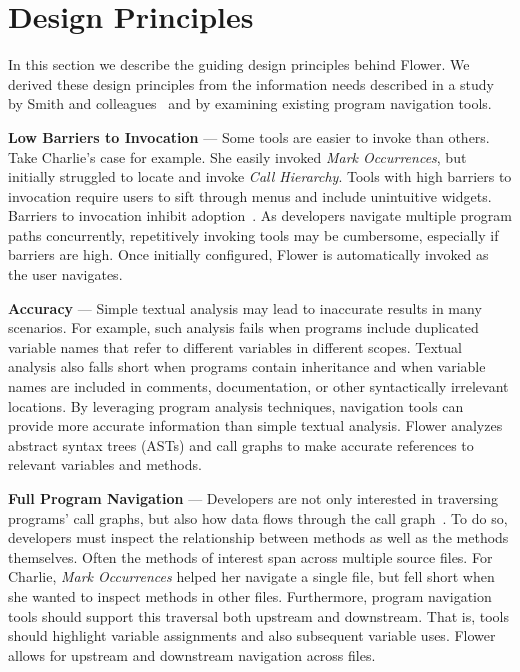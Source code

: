 \documentclass[conference]{IEEEtran}
\begin{document}
\section{Design Principles}
\label{DesignPrinciples}
In this section we describe the guiding design principles behind Flower. We derived these design principles from the information needs described in a study by Smith and colleagues~\cite{Smith2015} and by examining existing program navigation tools.

\vspace{1em} 
\noindent\textbf{Low Barriers to Invocation} ---
Some tools are easier to invoke than others. 
Take Charlie's case for example.
She easily invoked \emph{Mark Occurrences}, but initially struggled to locate and invoke \emph{Call Hierarchy}.
Tools with high barriers to invocation require users to sift through menus and include unintuitive widgets. 
Barriers to invocation inhibit adoption~\cite{johnson2013don}.
As developers navigate multiple program paths concurrently, repetitively invoking tools may be cumbersome, especially if barriers are high. 
Once initially configured, Flower is automatically invoked as the user navigates.

\vspace{1em} 
\noindent\textbf{Accuracy} ---
Simple textual analysis may lead to inaccurate results in many scenarios. For example, such analysis fails when programs include duplicated variable names that refer to different variables in different scopes. Textual analysis also falls short when programs contain inheritance and when variable names are included in comments, documentation, or other syntactically irrelevant locations.
By leveraging program analysis techniques, navigation tools can provide more accurate information than simple textual analysis.
Flower analyzes abstract syntax trees (ASTs) and call graphs to make accurate references to relevant variables and methods.

\vspace{1em} 
\noindent\textbf{Full Program Navigation}  ---
Developers are not only interested in traversing programs' call graphs, but also how data flows through the call graph~\cite{Smith2015}.
To do so, developers must inspect the relationship between methods as well as the methods themselves.
Often the methods of interest span across multiple source files.
For Charlie, \emph{Mark Occurrences} helped her navigate a single file, but fell short when she wanted to inspect methods in other files.
Furthermore, program navigation tools should support this traversal both upstream and downstream. 
That is, tools should highlight variable assignments and also subsequent variable uses. 
Flower allows for upstream and downstream navigation across files.
\end{document}
